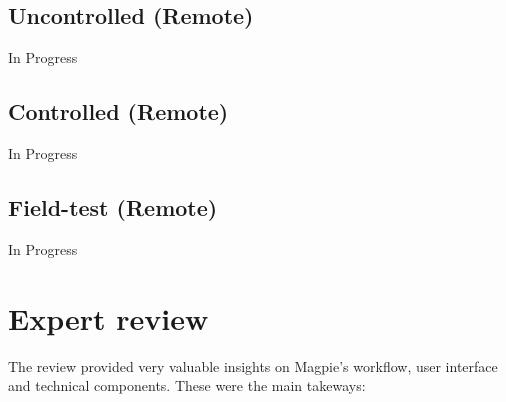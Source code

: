 \documentclass{report}
\begin{document}
\subsection{Uncontrolled (Remote)}
In Progress
\subsection{Controlled (Remote)}
In Progress
\subsection{Field-test (Remote)}
In Progress

\section{Expert review}
The review provided very valuable insights on Magpie's workflow, user interface and technical components. These were the main takeways:
\end{document}
